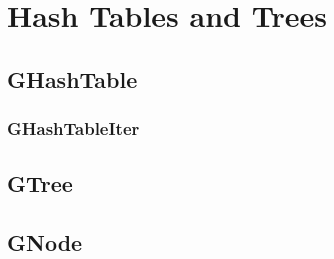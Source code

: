 \chapter{Hash Tables and Trees}

\section{GHashTable}
\subsection{GHashTableIter}

\section{GTree}

\section{GNode}
